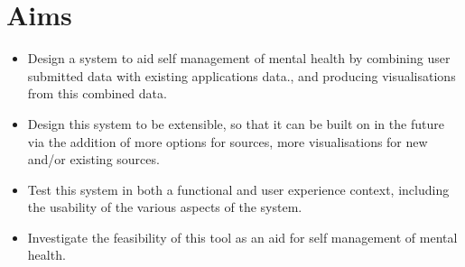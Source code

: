 \documentclass[11pt,openright,a4paper]{report}
\begin{document}
\section{Aims}
\begin{itemize}
\item Design a system to aid self management of mental health by combining user submitted data with existing applications data., and producing visualisations from this combined data.
\item Design this system to be extensible, so that it can be built on in the future via the addition of more options for sources, more visualisations for new and/or existing sources.
\item Test this system in both a functional and user experience context, including the usability of the various aspects of the system.
\item Investigate the feasibility of this tool as an aid for self management of mental health.
\end{itemize}
\end{document}
